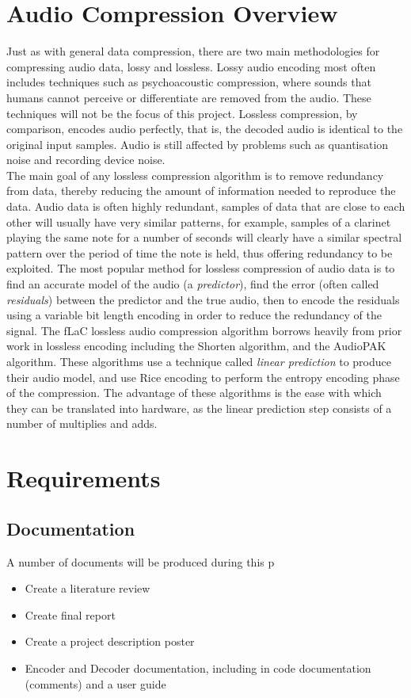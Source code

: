 \documentclass[12pt]{scrartcl}
\begin{document}
  \section{Audio Compression Overview}
  Just as with general data compression, there are two main methodologies for compressing audio data, lossy and lossless. Lossy audio encoding most often includes techniques such as psychoacoustic compression, where sounds that humans cannot perceive or differentiate are removed from the audio. These techniques will not be the focus of this project. Lossless compression, by comparison, encodes audio perfectly, that is, the decoded audio is identical to the original input samples. Audio is still affected by problems such as quantisation noise and recording device noise.\\
  The main goal of any lossless compression algorithm is to remove redundancy from data, thereby reducing the amount of information needed to reproduce the data. Audio data is often highly redundant, samples of data that are close to each other will usually have very similar patterns, for example, samples of a clarinet playing the same note for a number of seconds will clearly have a similar spectral pattern over the period of time the note is held, thus offering redundancy to be exploited. The most popular method for lossless compression of audio data is to find an accurate model of the audio (a \textit{predictor}), find the error (often called \textit{residuals}) between the predictor and the true audio, then to encode the residuals using a variable bit length encoding in order to reduce the redundancy of the signal. The fLaC lossless audio compression algorithm borrows heavily from prior  work in lossless encoding including the Shorten algorithm\cite{shorten}, and the AudioPAK algorithm\cite{audiopak}. These algorithms use a technique called \textit{linear prediction} to produce their audio model, and use Rice encoding to perform the entropy encoding phase of the compression. The advantage of these algorithms is the ease with which they can be translated into hardware, as the linear prediction step consists of a number of multiplies and adds.
  
  \section{Requirements}
  \subsection{Documentation}
  A number of documents will be produced during this p
  \begin{itemize}
  \item Create a literature review
  \item Create final report
  \item Create a project description poster
  \item Encoder and Decoder documentation, including in code documentation (comments) and a user guide
  \end{itemize}
  
\end{document}
